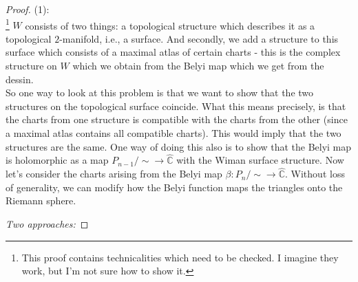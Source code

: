 \documentclass[reqno]{amsart}
\theoremstyle{definition}
\theoremstyle{remark}
\begin{document}
    \begin{proof}
        (1):\\
        \footnote{This proof contains technicalities which need to be checked.
        I imagine they work, but I'm not sure how to show it.}
        $W$ consists of two things: a topological structure which describes it as a topological $2$-manifold, i.e., a surface. And secondly, we add a structure to this surface which consists of
        a maximal atlas of certain charts - this is the complex structure on $W$ which we
        obtain from the Belyi map which we get from the dessin.\\
        So one way to look at this problem is that we want to show that the two structures on the topological surface coincide. What this means precisely, is that the charts from one structure is
        compatible with the charts from the other (since a maximal atlas contains all compatible charts).
        This would imply that the two structures are the same. One way of doing this also is to show that the Belyi map is holomorphic as a map
        $P_{n-1}/ \sim \to \hat{\mathbb{C}}$ with the Wiman surface structure.
        Now let's consider the charts
        arising from the Belyi map $\beta \colon P_n /\sim \to \hat{\mathbb{C}}$. 
        Without loss of generality, we can modify how the Belyi function maps the triangles onto
        the Riemann sphere. 

        \textit{Two approaches:}


\end{proof}
\end{document}
